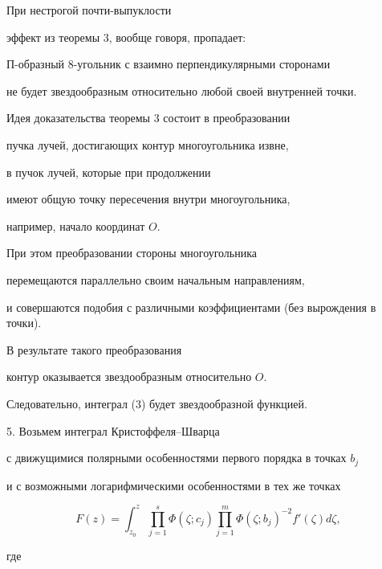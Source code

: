 \begin{note}


При нестрогой почти-выпуклости


эффект из теоремы 3, вообще говоря, пропадает:


П-образный 8-угольник с взаимно перпендикулярными сторонами


не будет звездообразным относительно любой своей внутренней точки.


\end{note}





Идея доказательства теоремы 3 состоит в преобразовании


пучка лучей, достигающих контур многоугольника извне,


в пучок лучей, которые при продолжении


имеют общую точку пересечения внутри многоугольника,


например, начало координат $O$.


При этом преобразовании стороны многоугольника


перемещаются параллельно своим начальным направлениям,


и совершаются подобия с различными коэффициентами (без вырождения в точки).


В результате такого преобразования


контур оказывается звездообразным относительно $O$.


Следовательно, интеграл (3) будет звездообразной функцией.





5. Возьмем интеграл Крис\-тоф\-фе\-ля--Швар\-ца


с движущимися полярными особенностями первого порядка в точках $b_{j}$


и с возможными логарифмическими особенностями в тех же точках


\begin{equation}


F(z)=\int_{z_{0}}^{z}\,\prod _{j=1}^{s}


\Phi(\zeta ; c_{j})


\prod_{j=1}^{m}\Phi(\zeta ; b_{j}) ^{-2}f'(\zeta)d\zeta,


\end{equation}




где


$$


